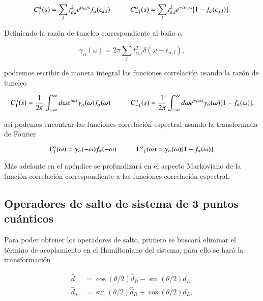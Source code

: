 \begin{appendixs}
\begin{equation*}
    C_{1}^{\alpha}(s) = \sum_{l}t^{2}_{\alpha,l}e^{i\epsilon_{\alpha,l}s} f_{\alpha}(\epsilon_{\alpha,l}) \hspace{10mm} C
    ^{\alpha}_{-1}(s) = \sum_{l}t^{2}_{\alpha,l}e^{-i\epsilon_{\alpha,l}s} [1-f_{\alpha}(\epsilon_{\alpha,l})].
\end{equation*}

Definiendo la razón de tuneleo correspondiente al baño $\alpha$

\begin{equation*}
    \gamma_{\alpha}(\omega) = 2\pi \sum_{l}t^{2}_{\alpha,l}\delta(\omega-\epsilon_{\alpha,l}),
\end{equation*}

podremos escribir de manera integral las funciones correlación usando la razón de tuneleo

\begin{equation*}
    C_{1}^{\alpha}(s) = \frac{1}{2\pi} \int_{-\infty}^{\infty}d\omega e^{i\omega s} \gamma_{\alpha}(\omega) f_{\alpha}(\omega)  \hspace{10mm} C_{-1}^{\alpha}(s) = \frac{1}{2\pi} \int_{-\infty}^{\infty}d\omega e^{-i\omega s} \gamma_{\alpha}(\omega) [1-f_{\alpha}(\omega)],
\end{equation*}

así podemos encontrar las funciones correlación espectral usando la transformada de Fourier

\begin{equation*}
    \Gamma_{1}^{\alpha}(\omega) = \gamma_{\alpha}(-\omega)f_{\alpha}(-\omega)  \hspace{10mm} \Gamma_{-1}^{\alpha}(\omega) = \gamma_{\alpha}(\omega)[1-f_{\alpha}(\omega)].
\end{equation*}

Más adelante en el apéndice se profundizará en el aspecto Markoviano de la función correlación correspondiente a las funciones correlación espectral.
\label{apendix5bathcorre}

\subsection{ Operadores de salto de sistema de 3 puntos cuánticos}
Para poder obtener los operadores de salto, primero se buscará eliminar el término de acoplamiento en el Hamiltoniano del sistema, para ello se hará la transformación

\begin{align*}
    \hat{d}_{-} & = \cos(\theta/2)\hat{d}_{R} - \sin(\theta/2)\hat{d}_{L} \\
    \hat{d}_{+} & = \sin(\theta/2)\hat{d}_{R} + \cos(\theta/2)\hat{d}_{L},
\end{align*}



\end{appendixs}
